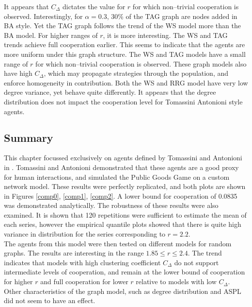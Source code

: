 It appears that $C_\Delta$ dictates the value for $r$ for which non--trivial cooperation is observed. Interestingly, for $\alpha = 0.3$, 30\% of the TAG graph are nodes added in BA style. Yet the TAG graph follows the trend of the WS model more than the BA model.
\FloatBarrier
{}
\FloatBarrier
For higher ranges of $r$, it is more interesting. The WS and TAG trends achieve full cooperation earlier. This seems to indicate that the agents are more uniform under this graph structure. The WS and TAG models have a small range of $r$ for which non--trivial cooperation is observed. These graph models also have high $C_\Delta$, which may propagate strategies through the population, and enforce homogeneity in contribution. Both the WS and RRG model have very low degree variance, yet behave quite differently. It appears that the degree distribution does not impact the cooperation level for Tomassini Antonioni style agents. \\

\subsection{Summary}

This chapter focussed exclusively on agents defined by Tomassini and Antonioni in \cite{RN49}. Tomassini and Antonioni demonstrated that these agents are a good proxy for human interactions, and simulated the Public Goods Game on a custom network model. These results were perfectly replicated, and both plots are shown in Figures \ref{comp0}, \ref{comp1}, \ref{comp2}.  A lower bound for cooperation of 0.0835 was demonstrated analytically. The robustness of these results were also examined. It is shown that 120 repetitions were sufficient to estimate the mean of each series, however the empirical quantile plots showed that there is quite high variance in distribution for the series corresponding to $r=2.2$.\\ 

The agents from this model were then tested on different models for random graphs. The results are interesting in the range $1.85\leq r \leq 2.4$. The trend indicates that models with high clustering coefficient $C_\Delta$ do not support intermediate levels of cooperation, and remain at the lower bound of cooperation for higher $r$ and full cooperation for lower $r$ relative to models with low $C_\Delta$. Other characteristics of the graph model, such as degree distribution and ASPL did not seem to have an effect. \\



